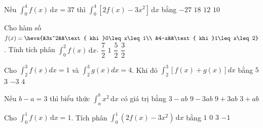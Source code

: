 \begin{ex}%
	Nếu $\displaystyle\int_0^4f(x)\mathrm{\,d}x=37$  thì $\displaystyle\int_0^4\left[2f(x)-3x^2\right]\mathrm{\,d}x$ bằng
	\choice 
		 {$-27$}
		 {$18$}
		 {$12$}
		{\True $10$} 
\end{ex}

\begin{ex}%
	Cho hàm số $f(x)=\heva{&3x^2&&\text{ khi }0\leq x\leq 1\\ 
	&4-x&&\text{  khi }1\leq x\leq 2}$. Tính tích phân $\displaystyle\int_0^2f(x)\mathrm{\,d}x$.
	 \choice
		 {\True $\dfrac{7}{2}$}
		{$1$} 
		 {$\dfrac{5}{2}$}
		 {$\dfrac{3}{2}$}
\end{ex}

\begin{ex}%
	Cho $\displaystyle\int_{2}^{3}f(x)dx = 1$ và $\displaystyle\int_{2}^{3}g(x)dx=4$. Khi đó $\displaystyle\int_{2}^{3}[f(x)+g(x)]dx$  bằng
	\choice 
		 {\True $5$}
		{$3$} 
		{$-3$} 
		{$4$} 
\end{ex}

\begin{ex}%
	Nếu $b-a=3$ thì  biểu thức $\displaystyle\int_a^b x^2\mathrm{\,d}x$ có giá trị bằng
	\choice 
		 {$3-ab$}
		 {$9-3ab$}
		{\True  $9+3ab$}
		{$3+ab$} 
\end{ex}

\begin{ex}%
	Cho $\displaystyle\int_{0}^{1}  f(x)\mathrm{\,d}x=1$. Tích phân $\displaystyle\int_{0}^{1} \left(2f(x)-3x^2\right)\mathrm{\,d}x$ bằng
	 \choice
		 {\True $1$}
		{$0$} 
		{$3$} 
		{$-1$} 
\end{ex}

